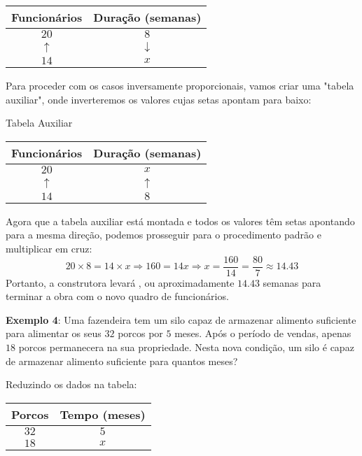 \documentclass[12pt]{report}
\newcommand{\1}{\faThermometerEmpty}
\newcommand{\2}{\faThermometerQuarter}
\newcommand{\3}{\faThermometerHalf}
\newcommand{\4}{\faThermometerThreeQuarters}
\newcommand{\5}{\faThermometerFull}
\begin{document}
\begin{center}
\begin{tabular}{|c | c|} 
 \hline
 Funcionários & Duração (semanas) \\ [0.5ex] 
 \hline \hline
 $20$ & $8$ \\ \hline
 $\uparrow$ &  $\downarrow$ \\ \hline
 $14$ & $x$ \\ 
 \hline
\end{tabular}
\end{center}

Para proceder com os casos inversamente proporcionais, vamos criar uma "tabela auxiliar", onde inverteremos os valores cujas setas apontam para baixo:

\begin{center}
{\footnotesize Tabela Auxiliar} \\
\begin{tabular}{|c | c|} 
 \hline
 Funcionários & Duração (semanas) \\ [0.5ex] 
 \hline \hline
 $20$ & $x$ \\ \hline
 $\uparrow$ &  $\uparrow$ \\ \hline
 $14$ & $8$ \\ 
 \hline
\end{tabular}
\end{center}

Agora que a tabela auxiliar está montada e todos os valores têm setas apontando para a mesma direção, podemos prosseguir para o procedimento padrão e multiplicar em cruz:
$$
20 \times 8 = 14 \times x \Rightarrow 160 = 14 x \Rightarrow x = \frac{160}{14} = \frac{80}{7} \approx 14.43
$$
Portanto, a construtora levará , ou aproximadamente $14.43$ semanas para terminar a obra com o novo quadro de funcionários.

\vspace{10pt}
\textbf{Exemplo 4}: Uma fazendeira tem um silo capaz de armazenar alimento suficiente para alimentar os seus $32$ porcos por $5$ meses. Após o período de vendas, apenas $18$ porcos permanecera na sua propriedade. Nesta nova condição, um silo é capaz de armazenar alimento suficiente para quantos meses?

Reduzindo os dados na tabela:

\begin{center}
\begin{tabular}{|c | c|} 
 \hline
 Porcos & Tempo (meses) \\ [0.5ex] 
 \hline \hline
 $32$ & $5$ \\ \hline
 $18$ & $x$ \\ 
 \hline
\end{tabular}
\end{center}
\end{document}
